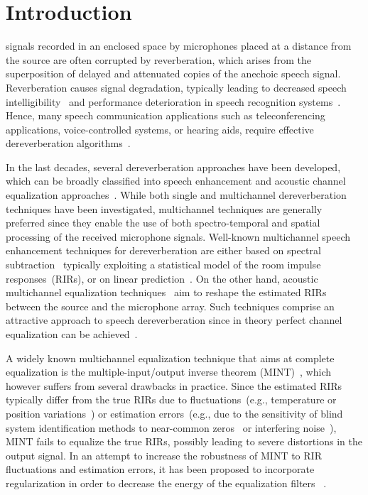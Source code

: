\documentclass[draftcls,onecolumn,11pt]{IEEEtran}
\begin{document}
\section{Introduction}
 signals recorded in an enclosed space by microphones placed at a distance from the source are often corrupted by reverberation, which arises from the superposition of delayed and attenuated copies of the anechoic speech signal.
Reverberation causes signal degradation, typically leading to decreased speech intelligibility~\cite{Houtgast_1985,Beutelmann_2006} and performance deterioration in speech recognition systems~\cite{Omologo_1998, Sehr_phd, Maas_ICASSP_2012}.
Hence, many speech communication applications such as teleconferencing applications, voice-controlled systems, or hearing aids, require effective dereverberation algorithms~\cite{Sehr_phd,Jeub_ITASP_2010,Maas_ICASSP_2012}.

In the last decades, several dereverberation approaches have been developed, which can be broadly classified into speech enhancement and acoustic channel equalization approaches~\cite{Naylor_Derev_book}.
While both single and multichannel dereverberation techniques have been investigated, multichannel techniques are generally preferred since they enable the use of both spectro-temporal and spatial processing of the received microphone signals.
Well-known multichannel speech enhancement techniques for dereverberation are either based on spectral subtraction~\cite{Habets_ITASLP_2008,Habets_ICASSP_2007} typically exploiting a statistical model of the room impulse responses~(RIRs), or on linear prediction~\cite{Gaubitch_JASA_2006,Delcroix_2007,Nakatani_ITASLP_2010}.
On the other hand, acoustic multichannel equalization techniques~\cite{Miyoshi_ITASS_1988,Kallinger_ICASSP_2006, Hikichi_EURASIP_2007, Mertins_ITASLP_2010, Zhang_IWAENC_2010, Haque_ITASLP_2011, Kodrasi_ICASSP_2012} aim to reshape the estimated RIRs between the source and the microphone array.
Such techniques comprise an attractive approach to speech dereverberation since in theory perfect channel equalization can be achieved~\cite{Miyoshi_ITASS_1988, Hacihabibouglu_ITASLP_2012}.

A widely known multichannel equalization technique that aims at complete equalization is the multiple-input/output inverse theorem (MINT)~\cite{Miyoshi_ITASS_1988}, which however suffers from several drawbacks in practice.
Since the estimated RIRs typically differ from the true RIRs due to fluctuations~(e.g., temperature or position variations~\cite{Radlovic_ITSA_2000}) or estimation errors~(e.g., due to the sensitivity of blind system identification methods to near-common zeros~\cite{Lin_ITASLP_2012} or interfering noise~\cite{Hasan_EUSIPCO_2006}), MINT fails to equalize the true RIRs, possibly leading to severe distortions in the output signal.
In an attempt to increase the robustness of MINT to RIR fluctuations and estimation errors, it has been proposed to incorporate regularization in order to decrease the energy of the equalization filters~\cite{Hikichi_EURASIP_2007} .
\end{document}
